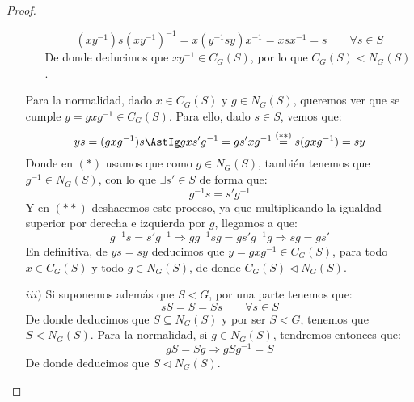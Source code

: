 \begin{prop}
\begin{proof}
\begin{enumerate}
\begin{itemize}
                        \begin{equation*}
                            (xy^{-1})s{(xy^{-1})}^{-1} = x(y^{-1}sy)x^{-1} = xsx^{-1} = s \qquad \forall s\in S
                        \end{equation*}
                        De donde deducimos que $xy^{-1}\in C_G(S)$, por lo que $C_G(S) < N_G(S)$.
                \end{itemize}
                Para la normalidad, dado $x\in C_G(S)$ y $g\in N_G(S)$, queremos ver que se cumple $y = gxg^{-1}\in C_G(S)$. Para ello, dado $s\in S$, vemos que:
                \begin{equation*}
                    ys = (gxg^{-1})s \AstIg gxs'g^{-1} = gs'xg^{-1} \stackrel{(\ast\ast)}{=} s(gxg^{-1}) = sy
                \end{equation*}
                Donde en $(\ast)$ usamos que como $g\in N_G(S)$, también tenemos que $g^{-1}\in N_G(S)$, con lo que $\exists s' \in S$ de forma que:
                \begin{equation*}
                    g^{-1}s = s'g^{-1}
                \end{equation*}
                Y en $(\ast\ast)$ deshacemos este proceso, ya que multiplicando la igualdad superior por derecha e izquierda por $g$, llegamos a que:
                \begin{equation*}
                    g^{-1}s = s'g^{-1} \Longrightarrow gg^{-1}sg = gs'g^{-1}g \Longrightarrow sg = gs'
                \end{equation*}
                En definitiva, de $ys = sy$ deducimos que $y = gxg^{-1}\in C_G(S)$, para todo $x\in C_G(S)$ y todo $g\in N_G(S)$, de donde $C_G(S)\lhd N_G(S)$.
            \item[$iii)$] Si suponemos además que $S<G$, por una parte tenemos que:
                \begin{equation*}
                    sS = S = Ss \qquad \forall s\in S
                \end{equation*}
                De donde deducimos que $S\subseteq N_G(S)$ y por ser $S<G$, tenemos que $S < N_G(S)$. Para la normalidad, si $g\in N_G(S)$, tendremos entonces que:
                \begin{equation*}
                    gS = Sg \Longrightarrow gSg^{-1} = S
                \end{equation*}
                De donde deducimos que $S \lhd N_G(S)$.
        \end{enumerate}
    \end{proof}
\end{prop}

